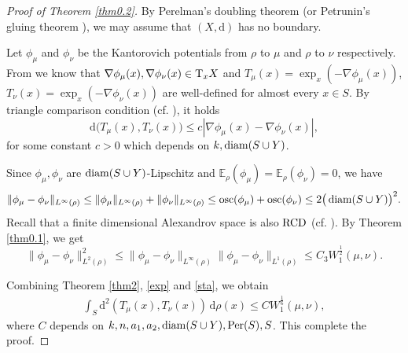 \documentclass[a4paper,11pt]{article}
\numberwithin{equation}{section}
\theoremstyle{plain}
\theoremstyle{definition}
\theoremstyle{remark}
\newcommand{\E}{\mathbb{E}}
\newcommand{\diam}{\mathop{\rm diam}\nolimits}
\renewcommand{\d}{{\mathrm d}}
\begin{document}
		\begin{proof}[Proof of Theorem \ref{thm0.2}]
		By Perelman's doubling theorem (or Petrunin's gluing theorem \cite{zbMATH01104278}),  we may assume that $(X,  \d)$ has no boundary.  
		
		Let $\phi_\mu$ and $\phi_\nu$ be the Kantorovich potentials from $\rho$ to $\mu$ and $\rho$ to $\nu$ respectively.   From \cite{zbMATH05349267,zbMATH06032507} we know that  $\nabla \phi_\mu(x),  \nabla \phi_\nu(x) \in  {\rm{T}}_xX$  and
		$T_\mu(x)= \exp_x(-\nabla \phi_\mu(x))$,  $T_\nu(x)= \exp_x(-\nabla \phi_\nu(x))$  are well-defined for almost every $x\in S$.   By triangle comparison condition (cf. \cite{zbMATH05342782}),  it holds
		\begin{equation}\label{exp}
			\d \big(T_\mu(x),   T_\nu(x) \big) \leq c|\nabla \phi_\mu(x)-\nabla \phi_\nu(x)|,
		\end{equation}
		for some constant $c>0$ which depends on $k, \diam(S\cup Y)$.  
		\medskip
		

Since $\phi_\mu,\phi_\nu$ are $\diam(S\cup Y)$-Lipschitz and  $\E_\rho(\phi_\mu)=\E_\rho(\phi_\nu)=0$, we have  
	\begin{equation*}
		\|\phi_\mu-\phi_\nu\|_{L^\infty(\rho)}\leq \|\phi_\mu\|_{L^\infty(\rho)}+ \|\phi_\nu\|_{L^\infty(\rho)}\leq {\rm{osc}}(\phi_\mu)+{\rm{osc}}(\phi_\nu)\leq 2\big(\diam(S\cup Y)\big)^2.
	\end{equation*}
Recall that a finite dimensional Alexandrov space is also  $\rm{RCD}$ (cf.  \cite{zbMATH06032507,zbMATH05962558}).    By Theorem \ref{thm0.1},   we  get
	\begin{equation}\label{sta}
		\|\phi_\mu-\phi_\nu\|^2_{L^2(\rho)} \leq \|\phi_\mu-\phi_\nu\|_{L^\infty(\rho)}\|\phi_\mu-\phi_\nu\|_{L^1(\rho)} \leq C_3 W_1^\frac{1}{2}(\mu,\nu).
	\end{equation}

		 Combining  Theorem \ref{thm2},   \eqref{exp} and  \eqref{sta}, we obtain
		\begin{equation}
			\begin{aligned}
				\int_S \d^2(T_\mu(x), T_\nu(x))\,\d \rho(x)	\leq C W_1^\frac{1}{6}(\mu,\nu),
			\end{aligned}
		\end{equation}
		where $C$ depends on $k,n,a_1, a_2, \diam(S\cup Y), {\rm{Per}}(S), S$.  This complete the proof.
	\end{proof}
	
\end{document}
